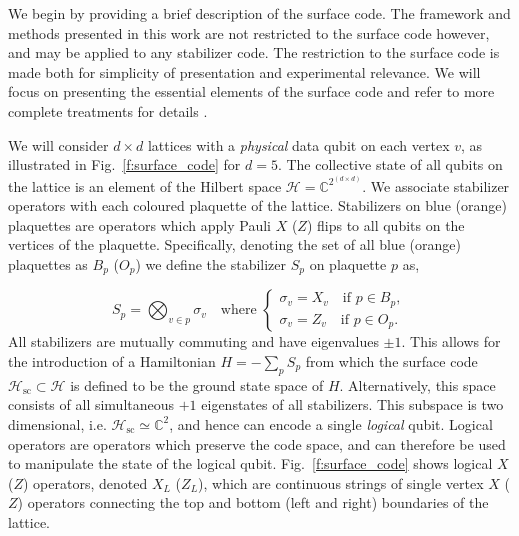 \documentclass[twocolumn,preprintnumbers,amsmath,amssymb,notitlepage,nofootinbib,longbibliography,superscriptaddress,aps,pra,10pt]{revtex4-1}
\begin{document}
	We begin by providing a brief description of the surface code.
	The framework and methods presented in this work are not restricted to the surface code however, and may be applied to any stabilizer code.
	The restriction to the surface code is made both for simplicity of presentation and experimental relevance.
	We will focus on presenting the essential elements of the surface code and refer to more complete treatments for details \cite{Gottesman97, Terhal15,Litinski18b}.

	We will consider $d\times d$ lattices with a \textit{physical} data qubit on each vertex $v$, as illustrated in Fig.~\ref{f:surface_code} for $d=5$.
	The collective state of all qubits on the lattice is an element of the Hilbert space $\mathcal{H} = \mathbb{C}^{2^{(d\times d)}}$.
	We associate stabilizer operators with each coloured plaquette of the lattice.
	Stabilizers on blue (orange) plaquettes are operators which apply Pauli $X$ ($Z$) flips to all qubits on the vertices of the plaquette.
	Specifically, denoting the set of all blue (orange) plaquettes as $B_p$ ($O_p$) we define the stabilizer $S_p$ on plaquette $p$ as,

	\begin{equation}\label{e:stabilizer_definition}
		S_p = \bigotimes_{v\in p} \sigma_v \quad \text{where }
		\begin{cases}
			\sigma_v = X_v \quad \text{if } p \in B_p,\\
			\sigma_v = Z_v \quad \text{if } p \in O_p.
		\end{cases}
	\end{equation}
	All stabilizers are mutually commuting and have eigenvalues $\pm 1$.
	This allows for the introduction of a  Hamiltonian $H = -\sum_p S_p$ from which the surface code $\mathcal{H}_\mathrm{sc} \subset \mathcal{H}$ is defined to be the ground state space of $H$.
	Alternatively, this space consists of all simultaneous $+1$ eigenstates of all stabilizers.
	This subspace is two dimensional, i.e. $\mathcal{H}_\mathrm{sc} \simeq \mathbb{C}^2$, and hence can encode a single \textit{logical} qubit.
	Logical operators are operators which preserve the code space, and can therefore be used to manipulate the state of the logical qubit.
	Fig.~\ref{f:surface_code} shows logical $X$ ($Z$) operators, denoted $X_L$ ($Z_L$), which are continuous strings of single vertex $X$ ($Z$) operators connecting the top and bottom (left and right) boundaries of the lattice.
\end{document}
